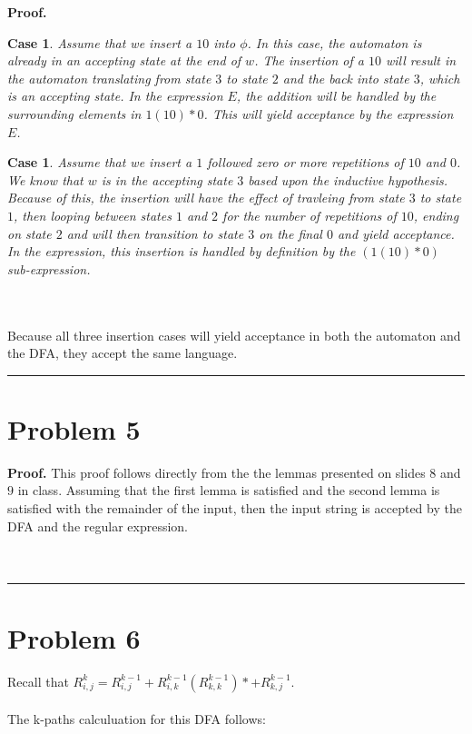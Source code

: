 \documentclass{article}%
\newtheorem{case}[theorem]{Case}
\newenvironment{proof}[1][Proof]{\noindent\textbf{#1.} }{\ \rule{0.5em}{0.5em}}
\begin{document}
\begin{proof}
    \begin{case}
        Assume that we insert a $10$ into $\phi$. In this case, the automaton is already in an accepting state at the end of $w$. The
        insertion of a $10$ will result in the automaton translating from state $3$ to state $2$ and the back into state $3$, which is
        an accepting state. In the expression $E$, the addition will be handled by the surrounding elements in $1(10)*0$. This will yield
        acceptance by the expression $E$.
    \end{case}

    \begin{case}
        Assume that we insert a $1$ followed zero or more repetitions of $10$ and $0$. We know that $w$ is in the accepting state $3$ based
        upon the inductive hypothesis. Because of this, the insertion will have the effect of travleing from state $3$ to state $1$, then
        looping between states $1$ and $2$ for the number of repetitions of $10$, ending on state $2$ and will then transition to state $3$
        on the final $0$ and yield acceptance. In the expression, this insertion is handled by definition by the $(1(10)*0)$ sub-expression.
    \end{case}\\
    \\
    Because all three insertion cases will yield acceptance in both the automaton and the DFA, they accept the same language.
\end{proof}

\section{Problem 5}

\begin{proof}
    This proof follows directly from the the lemmas presented on slides $8$ and $9$ in class. Assuming that the first lemma
    is satisfied and the second lemma is satisfied with the remainder of the input, then the input string is accepted by the
    DFA and the regular expression.\\
    \\
\end{proof}

\section{Problem 6}

Recall that $R_{i,j}^k = R_{i,j}^{k-1} + R_{i,k}^{k-1}(R_{k,k}^{k-1})* + R_{k,j}^{k-1}$.\\
\\
The k-paths calculuation for this DFA follows:\\
\\
\end{document}

